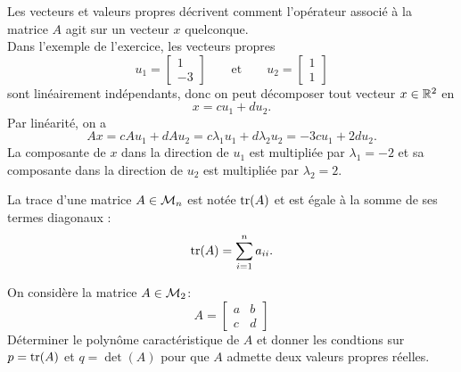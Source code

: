 \remark Les vecteurs et valeurs propres décrivent comment l'opérateur associé à la matrice $A$ agit sur un vecteur $x$ quelconque. \\
Dans l'exemple de l'exercice, les vecteurs propres 
$$
u_1 = \left[\begin{array}{r} 1 \\ -3 \end{array}\right]
\qquad \text{et} \qquad 
u_2 = \left[\begin{array}{r} 1 \\ 1 \end{array}\right]
$$
sont linéairement indépendants, donc on peut décomposer tout vecteur $x \in \mathbb{R}^2$ en
$$
x = c u_1 + d u_2.
$$
Par linéarité, on a 
$$
A x = c A u_1 + d A u_2 = c \lambda_1 u_1 + d \lambda_2 u_2 = -3 c u_1 + 2 d u_2.
$$
La composante de $x$ dans la direction de $u_1$ est multipliée par $\lambda_1 = -2$ et sa composante dans la direction de $u_2$ est multipliée par $\lambda_2 = 2$.


\begin{definition*}[Trace]
  La trace d'une matrice $A \in \mathcal{M}_n$ est notée $\operatorname{tr}(A)$ et est égale à la somme de ses termes diagonaux :
  $$
  \operatorname{tr}(A) = \sum_{i=1}^n a_{ii}.
  $$
\end{definition*}


\begin{exercise*}
  On considère la matrice $A \in \mathcal{M}_2$:
  $$
  A = \left[\begin{array}{cc} a & b \\ c & d\end{array}\right]
  $$
  Déterminer le polynôme caractéristique de $A$ et donner les condtions sur $p = \operatorname{tr}(A)$ et $q = \det(A)$ pour que $A$ admette deux valeurs propres réelles.
\end{exercise*}


